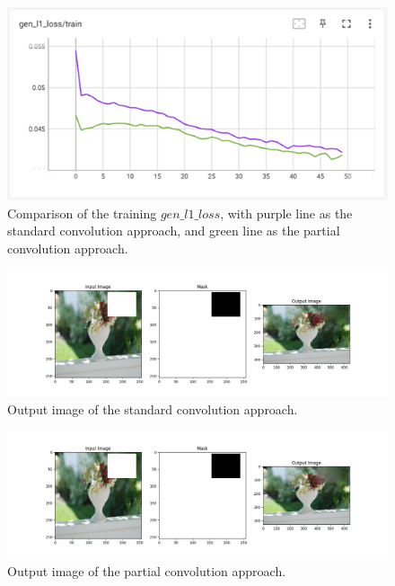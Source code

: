 \documentclass[10pt,twocolumn,letterpaper]{article}
\begin{document}
\begin{figure}[t]
    \centering
    \includegraphics[width=\linewidth]{figures/milestone/stand_vs_pconv.png}
    \caption{Comparison of the training $gen\_l1\_loss$, with purple line as the standard convolution approach, and green line as the partial convolution approach.}
    \label{fig:stand_vs_pconv}
\end{figure}

\begin{figure}[t]
    \centering
    \includegraphics[width=\linewidth]{figures/milestone/out_standconv.png}
    \caption{Output image of the standard convolution approach.}
    \label{fig:out_standconv}
\end{figure}

\begin{figure}[t]
    \centering
    \includegraphics[width=\linewidth]{figures/milestone/out_pconv.png}
    \caption{Output image of the partial convolution approach.}
    \label{fig:out_pconv}
\end{figure}
\end{document}
